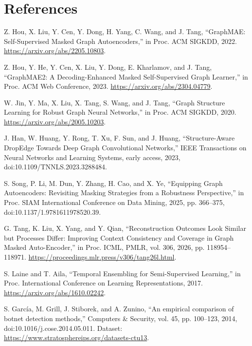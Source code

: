 \documentclass[11pt,letterpaper]{article}
\begin{document}
\section*{References}\begin{enumerate}[label={[\arabic*]},leftmargin=6mm,labelsep=1.5mm,itemsep=3pt,parsep=0pt,topsep=0pt]

\item Z. Hou, X. Liu, Y. Cen, Y. Dong, H. Yang, C. Wang, and J. Tang, “GraphMAE: Self-Supervised Masked Graph Autoencoders,” in Proc. ACM SIGKDD, 2022. \url{https://arxiv.org/abs/2205.10803}.

\item Z. Hou, Y. He, Y. Cen, X. Liu, Y. Dong, E. Kharlamov, and J. Tang, “GraphMAE2: A Decoding-Enhanced Masked Self-Supervised Graph Learner,” in Proc. ACM Web Conference, 2023. \url{https://arxiv.org/abs/2304.04779}.

\item W. Jin, Y. Ma, X. Liu, X. Tang, S. Wang, and J. Tang, “Graph Structure Learning for Robust Graph Neural Networks,” in Proc. ACM SIGKDD, 2020. \url{https://arxiv.org/abs/2005.10203}.

\item J. Han, W. Huang, Y. Rong, T. Xu, F. Sun, and J. Huang, “Structure-Aware DropEdge Towards Deep Graph Convolutional Networks,” IEEE Transactions on Neural Networks and Learning Systems, early access, 2023, doi:10.1109/TNNLS.2023.3288484.

\item S. Song, P. Li, M. Dun, Y. Zhang, H. Cao, and X. Ye, “Equipping Graph Autoencoders: Revisiting Masking Strategies from a Robustness Perspective,” in Proc. SIAM International Conference on Data Mining, 2025, pp. 366–375, doi:10.1137/1.9781611978520.39.

\item G. Tang, K. Liu, X. Yang, and Y. Qian, “Reconstruction Outcomes Look Similar but Processes Differ: Improving Context Consistency and Coverage in Graph Masked Auto-Encoder,” in Proc. ICML, PMLR, vol. 306, 2026, pp. 118954–118971. \url{https://proceedings.mlr.press/v306/tang26l.html}.

\item S. Laine and T. Aila, “Temporal Ensembling for Semi-Supervised Learning,” in Proc. International Conference on Learning Representations, 2017. \url{https://arxiv.org/abs/1610.02242}.

\item S. García, M. Grill, J. Stiborek, and A. Zunino, “An empirical comparison of botnet detection methods,” Computers \& Security, vol. 45, pp. 100–123, 2014, doi:10.1016/j.cose.2014.05.011. Dataset: \url{https://www.stratosphereips.org/datasets-ctu13}.


\end{enumerate}
\end{document}
